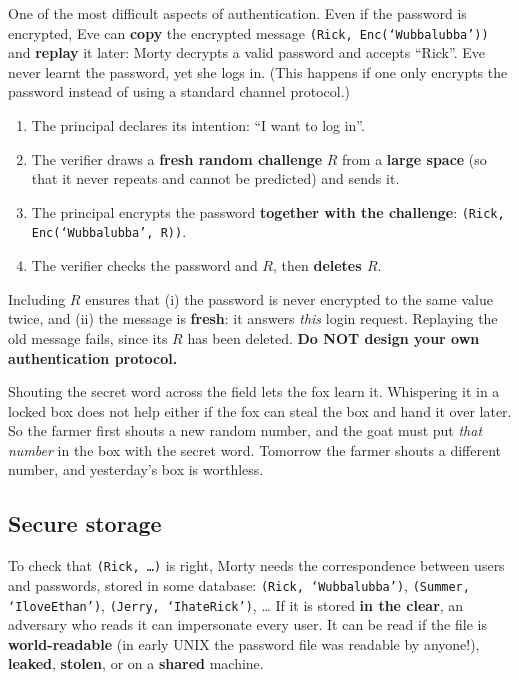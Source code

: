 \begin{warnbox}[title=Beware of replay attacks]
One of the most difficult aspects of authentication. Even if the password is encrypted, Eve can
\textbf{copy} the encrypted message \texttt{(Rick, Enc(`Wubbalubba'))} and \textbf{replay} it
later: Morty decrypts a valid password and accepts ``Rick''. Eve never learnt the password, yet
she logs in. (This happens if one only encrypts the password instead of using a standard channel
protocol.)
\end{warnbox}

\begin{defnbox}[title=Challenge-response protocols (solution to replay attacks)]
\begin{enumerate}
  \item The principal declares its intention: ``I want to log in''.
  \item The verifier draws a \textbf{fresh random challenge} $R$ from a \textbf{large space} (so
        that it never repeats and cannot be predicted) and sends it.
  \item The principal encrypts the password \textbf{together with the challenge}:
        \texttt{(Rick, Enc(`Wubbalubba', R))}.
  \item The verifier checks the password and $R$, then \textbf{deletes $R$}.
\end{enumerate}
Including $R$ ensures that (i) the password is never encrypted to the same value twice, and (ii)
the message is \textbf{fresh}: it answers \emph{this} login request. Replaying the old message
fails, since its $R$ has been deleted. \textbf{Do NOT design your own authentication protocol.}
\end{defnbox}

\begin{goatbox}
Shouting the secret word across the field lets the fox learn it. Whispering it in a locked box
does not help either if the fox can steal the box and hand it over later. So the farmer first
shouts a new random number, and the goat must put \emph{that number} in the box with the secret
word. Tomorrow the farmer shouts a different number, and yesterday's box is worthless.
\end{goatbox}

\subsection{Secure storage}

\begin{defnbox}[title=Why storage matters]
To check that \texttt{(Rick, \ldots)} is right, Morty needs the correspondence between users and
passwords, stored in some database: \texttt{(Rick, `Wubbalubba')}, \texttt{(Summer,
`IloveEthan')}, \texttt{(Jerry, `IhateRick')}, \ldots{} If it is stored \textbf{in the clear}, an
adversary who reads it can impersonate every user. It can be read if the file is
\textbf{world-readable} (in early UNIX the password file was readable by anyone!),
\textbf{leaked}, \textbf{stolen}, or on a \textbf{shared} machine.
\end{defnbox}

